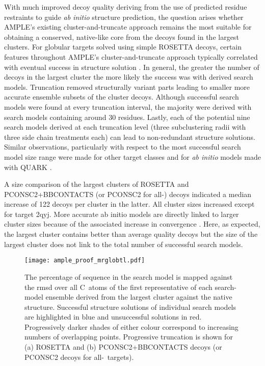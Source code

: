 With much improved decoy quality deriving from the use of predicted residue restraints to guide \textit{ab initio} structure prediction, the question arises whether AMPLE’s existing cluster-and-truncate approach remains the most suitable for obtaining a conserved, native-like core from the decoys found in the largest clusters. For globular targets solved using simple ROSETTA decoys, certain features throughout AMPLE’s cluster-and-truncate approach typically correlated with eventual success in structure solution \cite{Bibby2012-lm}. In general, the greater the number of decoys in the largest cluster the more likely the success was with derived search models. Truncation removed structurally variant parts leading to smaller more accurate ensemble subsets of the cluster decoys. Although successful search models were found at every truncation interval, the majority were derived with search models containing around 30 residues. Lastly, each of the potential nine search models derived at each truncation level (three subclustering radii with three side chain treatments each) can lead to non-redundant structure solutions. Similar observations, particularly with respect to the most successful search model size range were made for other target classes \cite{Thomas2017-sh, Thomas2015-wu} and for \textit{ab initio} models made with QUARK \cite{Keegan2015-zb}.

A size comparison of the largest clusters of ROSETTA and PCONSC2+BBCONTACTS (or PCONSC2 for all-\textalpha) decoys indicated a median increase of 122 decoys per cluster in the latter. All cluster sizes increased except for target 2qyj. More accurate ab initio models are directly linked to larger cluster sizes because of the associated increase in convergence \cite{Simons1997-oe}. Here, as expected, the largest cluster contains better than average quality decoys but the size of the largest cluster does not link to the total number of successful search models.  

\begin{figure}[H]
    \centering
    \texttt{[image: ample\_proof\_mrglobtl.pdf]}
    \caption[Effect of progressive truncation on RMSD of ensemble centroid]{The percentage of sequence in the search model is mapped against the \gls{rmsd} over all C\textalpha\ atoms of the first representative of each search-model ensemble derived from the largest cluster against the native structure. Successful structure solutions of individual search models are highlighted in blue and unsuccessful solutions in red.  Progressively darker shades of either colour correspond to increasing numbers of overlapping points.  Progressive truncation is shown for (a) ROSETTA and (b) PCONSC2+BBCONTACTS decoys (or PCONSC2 decoys for all-\textalpha\ targets).}
    \label{fig:ample_proof_mrglobtl}
\end{figure}

